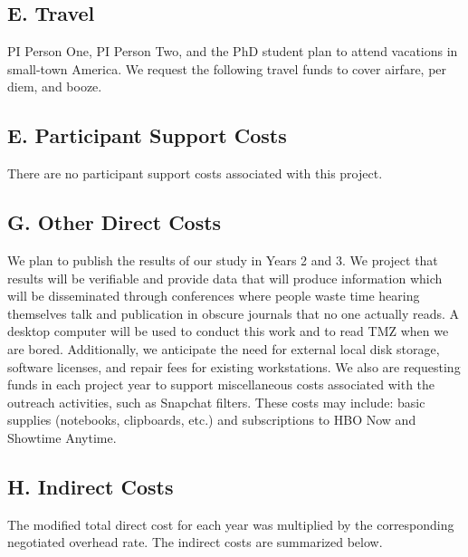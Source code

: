 \subsection*{E. Travel}
PI Person One, PI Person Two, and the PhD student plan to attend vacations in small-town America. We request the following travel funds to cover airfare, per diem, and booze.

\subsection*{E. Participant Support Costs}
There are no participant support costs associated with this project.

\subsection*{G. Other Direct Costs}
We plan to publish the results of our study in Years 2 and 3. We project that results will be verifiable and provide data that will produce information which will be disseminated through conferences where people waste time hearing themselves talk and publication in obscure journals that no one actually reads. A desktop computer will be used to conduct this work and to read TMZ when we are bored. Additionally, we anticipate the need for external local disk storage, software licenses, and repair fees for existing workstations. We also are requesting funds in each project year to support miscellaneous costs associated with the outreach activities, such as Snapchat filters.  These costs may include: basic supplies (notebooks, clipboards, etc.) and subscriptions to HBO Now and Showtime Anytime.

\subsection*{H. Indirect Costs}

\noindent The modified total direct cost for each year was multiplied by the corresponding negotiated overhead rate. The indirect costs are summarized below.
